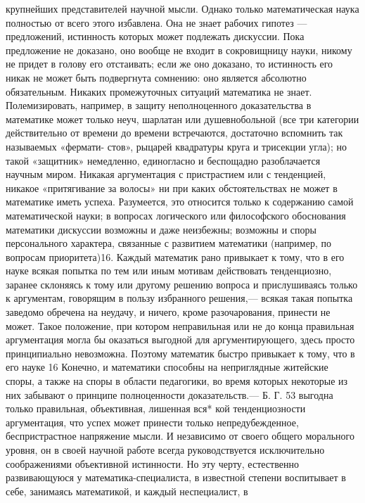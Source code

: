 \documentclass[12pt, a4paper, openany]{book}
\begin{document}
крупнейших представителей научной мысли. 
Однако только математическая наука полностью от 
всего этого избавлена. Она не знает рабочих гипотез — 
предложений, истинность которых может подлежать  
дискуссии. Пока предложение не доказано, оно вообще не 
входит в сокровищницу науки, никому не придет в голову 
его отстаивать; если же оно доказано, то истинность его 
никак не может быть подвергнута сомнению: оно является 
абсолютно обязательным. Никаких промежуточных  
ситуаций математика не знает. Полемизировать, например, 
в защиту неполноценного доказательства в математике 
может только неуч, шарлатан или душевнобольной (все 
три категории действительно от времени до времени  
встречаются, достаточно вспомнить так называемых «фермати- 
стов», рыцарей квадратуры круга и трисекции угла); 
но такой «защитник» немедленно, единогласно и  
беспощадно разоблачается научным миром. Никакая  
аргументация с пристрастием или с тенденцией, никакое  
«притягивание за волосы» ни при каких обстоятельствах не может 
в математике иметь успеха. Разумеется, это относится  
только к содержанию самой математической науки; в вопросах 
логического или философского обоснования математики 
дискуссии возможны и даже неизбежны; возможны и 
споры персонального характера, связанные с развитием 
математики (например, по вопросам приоритета)16. 
Каждый математик рано привыкает к тому, что в его 
науке всякая попытка по тем или иным мотивам  
действовать тенденциозно, заранее склоняясь к тому или другому 
решению вопроса и прислушиваясь только к аргументам, 
говорящим в пользу избранного решения,— всякая такая 
попытка заведомо обречена на неудачу, и ничего, кроме 
разочарования, принести не может. Такое положение, 
при котором неправильная или не до конца правильная 
аргументация могла бы оказаться выгодной для  
аргументирующего, здесь просто принципиально невозможна.  
Поэтому математик быстро привыкает к тому, что в его науке 
16 Конечно, и математики способны на неприглядные  
житейские споры, а также на споры в области педагогики, во время  
которых некоторые из них забывают о принципе полноценности  
доказательств.— Б. Г. 
53 
выгодна только правильная, объективная, лишенная вся* 
кой тенденциозности аргументация, что успех может  
принести только непредубежденное, беспристрастное  
напряжение мысли. И независимо от своего общего морального 
уровня, он в своей научной работе всегда руководствуется 
исключительно соображениями объективной истинности. 
Но эту черту, естественно развивающуюся у  
математика-специалиста, в известной степени воспитывает в себе, 
занимаясь математикой, и каждый неспециалист, в  
\end{document}

